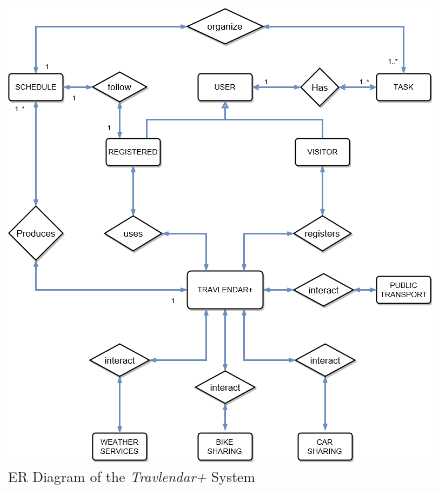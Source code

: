 \begin{figure}[H]
    \centering
    \includegraphics[scale=0.5]{Pictures/ScenarioER.png}
    \caption{ER Diagram of the \emph{Travlendar+} System}
\end{figure}
